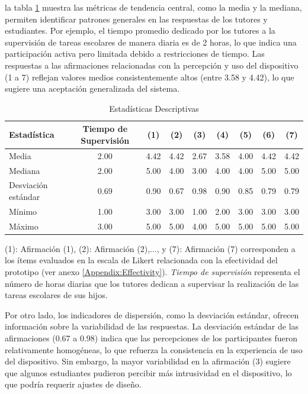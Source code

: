 la tabla \ref{table:DescriptiveStatistics} muestra las métricas de tendencia central, como la media y la mediana, permiten identificar patrones generales en las respuestas de los tutores y estudiantes. Por ejemplo, el tiempo promedio dedicado por los tutores a la supervisión de tareas escolares de manera diaria es de 2 horas, lo que indica una participación activa pero limitada debido a restricciones de tiempo. Las respuestas a las afirmaciones relacionadas con la percepción y uso del dispositivo (1 a 7) reflejan valores medios consistentemente altos (entre 3.58 y 4.42), lo que sugiere una aceptación generalizada del sistema.

\begin{table}[h!]
\centering
\caption{Estadísticas Descriptivas}
\begin{tabularx}{0.85\textwidth}{Xcccccccc}
	\toprule
	\textbf{Estadística} & \textbf{Tiempo de Supervisión} & \textbf{(1)} & \textbf{(2)} & \textbf{(3)} & \textbf{(4)} & \textbf{(5)} & \textbf{(6)} & \textbf{(7)} \\
	\midrule
	Media & 2.00 & 4.42 & 4.42 & 2.67 & 3.58 & 4.00 & 4.42 & 4.42 \\
	Mediana & 2.00 & 5.00 & 4.00 & 3.00 & 4.00 & 4.00 & 5.00 & 5.00 \\
	Desviación estándar & 0.69 & 0.90 & 0.67 & 0.98 & 0.90 & 0.85 & 0.79 & 0.79 \\
	Mínimo & 1.00 & 3.00 & 3.00 & 1.00 & 2.00 & 3.00 & 3.00 & 3.00 \\
	Máximo & 3.00 & 5.00 & 5.00 & 4.00 & 5.00 & 5.00 & 5.00 & 5.00 \\
	\bottomrule
\end{tabularx}
\label{table:DescriptiveStatistics}
\vspace{0.3em} %
\parbox{0.85\textwidth}{\footnotesize
	(1): Afirmación (1), (2): Afirmación (2),..., y (7): Afirmación (7) corresponden a los ítems evaluados en la escala de Likert relacionada con la efectividad del prototipo (ver anexo \ref{Appendix:Effectivity}). \textit{Tiempo de supervisión} representa el número de horas diarias que los tutores dedican a supervisar la realización de las tareas escolares de sus hijos.
}
\end{table}

Por otro lado, los indicadores de dispersión, como la desviación estándar, ofrecen información sobre la variabilidad de las respuestas. La desviación estándar de las afirmaciones (0.67 a 0.98) indica que las percepciones de los participantes fueron relativamente homogéneas, lo que refuerza la consistencia en la experiencia de uso del dispositivo. Sin embargo, la mayor variabilidad en la afirmación (3) sugiere que algunos estudiantes pudieron percibir más intrusividad en el dispositivo, lo que podría requerir ajustes de diseño.

